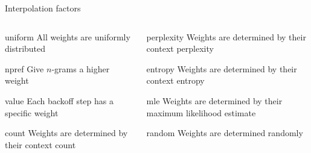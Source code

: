 \documentclass[department=cls, grouplogo=lama, notes={hide notes}, slidesperpage=1, official=true]{beamerruhuisstijl}
\begin{document}
\begin{frame}{Interpolation factors}
\begin{columns}
\begin{column}{0.5\textwidth}
\begin{block}{uniform}
    All weights are uniformly distributed
\end{block}
\begin{block}{npref}
    Give $n$-grams a higher weight
\end{block}
\begin{block}{value}
    Each backoff step has a specific weight
\end{block}
\begin{block}{count}
    Weights are determined by their context count
\end{block}
\end{column}
\begin{column}{0.5\textwidth}  %
\begin{block}{perplexity}
    Weights are determined by their context perplexity
\end{block}
\begin{block}{entropy}
    Weights are determined by their context entropy
\end{block}
\begin{block}{mle}
    Weights are determined by their maximum likelihood estimate
\end{block}
\begin{block}{random}
    Weights are determined randomly
\end{block}
\end{column}
\end{columns}
\end{frame}
\end{document}
